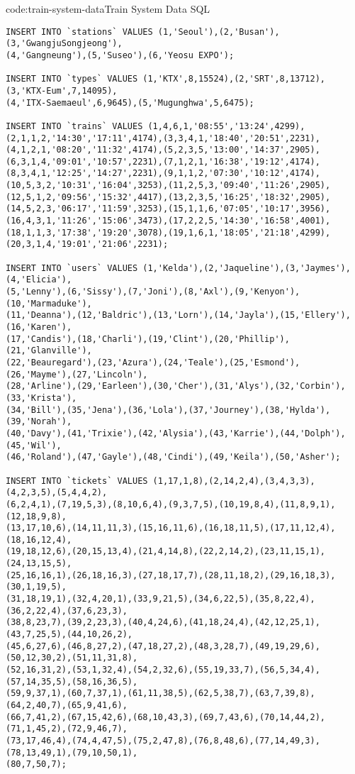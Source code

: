 \begin{code}{code:train-system-data}{Train System Data SQL}
\begin{verbatim}
INSERT INTO `stations` VALUES (1,'Seoul'),(2,'Busan'),(3,'GwangjuSongjeong'),
(4,'Gangneung'),(5,'Suseo'),(6,'Yeosu EXPO');

INSERT INTO `types` VALUES (1,'KTX',8,15524),(2,'SRT',8,13712),(3,'KTX-Eum',7,14095),
(4,'ITX-Saemaeul',6,9645),(5,'Mugunghwa',5,6475);

INSERT INTO `trains` VALUES (1,4,6,1,'08:55','13:24',4299),
(2,1,1,2,'14:30','17:11',4174),(3,3,4,1,'18:40','20:51',2231),
(4,1,2,1,'08:20','11:32',4174),(5,2,3,5,'13:00','14:37',2905),
(6,3,1,4,'09:01','10:57',2231),(7,1,2,1,'16:38','19:12',4174),
(8,3,4,1,'12:25','14:27',2231),(9,1,1,2,'07:30','10:12',4174),
(10,5,3,2,'10:31','16:04',3253),(11,2,5,3,'09:40','11:26',2905),
(12,5,1,2,'09:56','15:32',4417),(13,2,3,5,'16:25','18:32',2905),
(14,5,2,3,'06:17','11:59',3253),(15,1,1,6,'07:05','10:17',3956),
(16,4,3,1,'11:26','15:06',3473),(17,2,2,5,'14:30','16:58',4001),
(18,1,1,3,'17:38','19:20',3078),(19,1,6,1,'18:05','21:18',4299),
(20,3,1,4,'19:01','21:06',2231);

INSERT INTO `users` VALUES (1,'Kelda'),(2,'Jaqueline'),(3,'Jaymes'),(4,'Elicia'),
(5,'Lenny'),(6,'Sissy'),(7,'Joni'),(8,'Axl'),(9,'Kenyon'),(10,'Marmaduke'),
(11,'Deanna'),(12,'Baldric'),(13,'Lorn'),(14,'Jayla'),(15,'Ellery'),(16,'Karen'),
(17,'Candis'),(18,'Charli'),(19,'Clint'),(20,'Phillip'),(21,'Glanville'),
(22,'Beauregard'),(23,'Azura'),(24,'Teale'),(25,'Esmond'),(26,'Mayme'),(27,'Lincoln'),
(28,'Arline'),(29,'Earleen'),(30,'Cher'),(31,'Alys'),(32,'Corbin'),(33,'Krista'),
(34,'Bill'),(35,'Jena'),(36,'Lola'),(37,'Journey'),(38,'Hylda'),(39,'Norah'),
(40,'Davy'),(41,'Trixie'),(42,'Alysia'),(43,'Karrie'),(44,'Dolph'),(45,'Wil'),
(46,'Roland'),(47,'Gayle'),(48,'Cindi'),(49,'Keila'),(50,'Asher');

INSERT INTO `tickets` VALUES (1,17,1,8),(2,14,2,4),(3,4,3,3),(4,2,3,5),(5,4,4,2),
(6,2,4,1),(7,19,5,3),(8,10,6,4),(9,3,7,5),(10,19,8,4),(11,8,9,1),(12,18,9,8),
(13,17,10,6),(14,11,11,3),(15,16,11,6),(16,18,11,5),(17,11,12,4),(18,16,12,4),
(19,18,12,6),(20,15,13,4),(21,4,14,8),(22,2,14,2),(23,11,15,1),(24,13,15,5),
(25,16,16,1),(26,18,16,3),(27,18,17,7),(28,11,18,2),(29,16,18,3),(30,1,19,5),
(31,18,19,1),(32,4,20,1),(33,9,21,5),(34,6,22,5),(35,8,22,4),(36,2,22,4),(37,6,23,3),
(38,8,23,7),(39,2,23,3),(40,4,24,6),(41,18,24,4),(42,12,25,1),(43,7,25,5),(44,10,26,2),
(45,6,27,6),(46,8,27,2),(47,18,27,2),(48,3,28,7),(49,19,29,6),(50,12,30,2),(51,11,31,8),
(52,16,31,2),(53,1,32,4),(54,2,32,6),(55,19,33,7),(56,5,34,4),(57,14,35,5),(58,16,36,5),
(59,9,37,1),(60,7,37,1),(61,11,38,5),(62,5,38,7),(63,7,39,8),(64,2,40,7),(65,9,41,6),
(66,7,41,2),(67,15,42,6),(68,10,43,3),(69,7,43,6),(70,14,44,2),(71,1,45,2),(72,9,46,7),
(73,17,46,4),(74,4,47,5),(75,2,47,8),(76,8,48,6),(77,14,49,3),(78,13,49,1),(79,10,50,1),
(80,7,50,7);
\end{verbatim}
\end{code}
